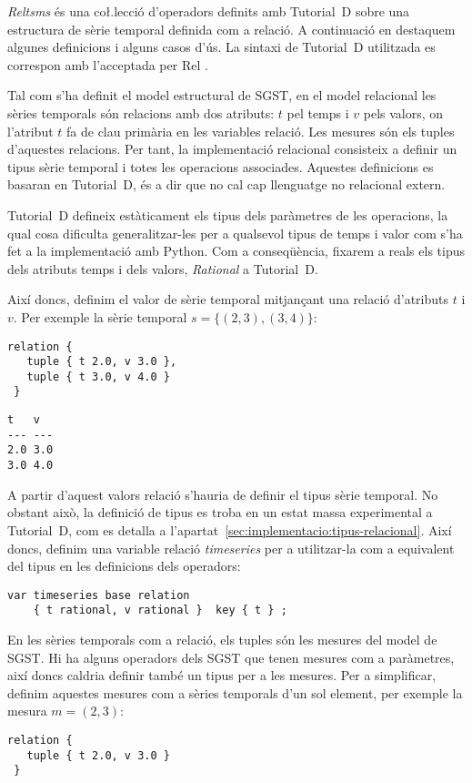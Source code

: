 \emph{Reltsms} és una co\l.lecció d'operadors definits amb Tutorial~D
sobre una estructura de sèrie temporal definida com a relació. A
continuació en destaquem algunes definicions i alguns casos d'ús.  La
sintaxi de Tutorial~D utilitzada es correspon amb l'acceptada per
Rel \parencite{rel}.



Tal com s'ha definit el model estructural de \gls{SGST}, en el model
relacional les sèries temporals són relacions amb dos atributs: $t$
pel temps i $v$ pels valors, on l'atribut $t$ fa de clau primària en
les variables relació.  Les mesures són els tuples d'aquestes
relacions.  Per tant, la implementació relacional consisteix a definir
un tipus sèrie temporal i totes les operacions associades. Aquestes
definicions es basaran en Tutorial~D, és a dir que no cal cap
llenguatge no relacional extern.

Tutorial~D defineix estàticament els tipus dels paràmetres de les
operacions, la qual cosa dificulta generalitzar-les per a qualsevol
tipus de temps i valor com s'ha fet a la implementació amb Python. Com
a conseqüència, fixarem a reals els tipus dels atributs temps i dels
valors, \emph{Rational} a Tutorial~D.


Així doncs, definim el valor de sèrie temporal mitjançant
una relació d'atributs $t$ i $v$. Per exemple la sèrie temporal $s=\{
(2,3), (3,4) \}$:
\begin{lstlisting}[style=tutorialD]
relation {
   tuple { t 2.0, v 3.0 },
   tuple { t 3.0, v 4.0 }
 }
\end{lstlisting}
\begin{lstlisting}[style=stdout]
 t   v 
--- ---
2.0 3.0
3.0 4.0
\end{lstlisting}


A partir d'aquest valors relació s'hauria de definir el tipus sèrie
temporal. No obstant això, la definició de tipus es troba en un estat
massa experimental a Tutorial~D, com es detalla a
l'apartat~\ref{sec:implementacio:tipus-relacional}. Així doncs,
definim una variable relació \emph{timeseries} per a utilitzar-la com a
equivalent del tipus en les definicions dels operadors:
\begin{lstlisting}[style=tutorialD]
var timeseries base relation
    { t rational, v rational }  key { t } ;
\end{lstlisting}


En les sèries temporals com a relació, els tuples són les mesures del
model de \gls{SGST}. Hi ha alguns operadors dels \gls{SGST} que tenen
mesures com a paràmetres, 
així doncs caldria definir també un tipus per a les mesures. Per a
simplificar, definim aquestes mesures com a sèries temporals d'un sol
element, per exemple la mesura $m=(2,3)$:
\begin{lstlisting}[style=tutorialD]
relation {
   tuple { t 2.0, v 3.0 }
 }
\end{lstlisting}


